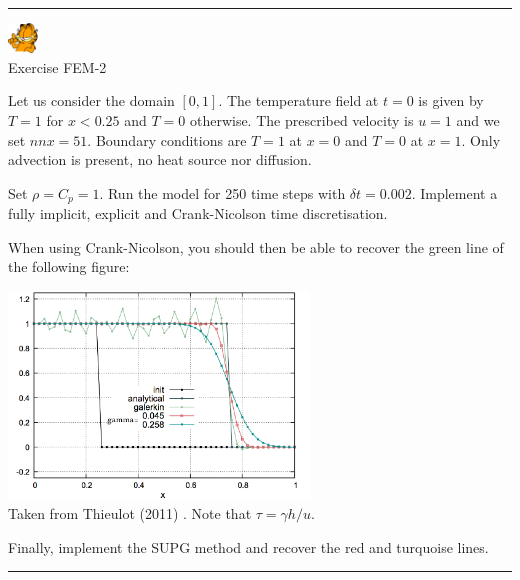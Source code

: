 \begin{center}
\begin{minipage}[t]{0.77\textwidth}
\par\noindent\rule{\textwidth}{0.4pt}

\begin{center}
\includegraphics[width=0.8cm]{images/garftr} \\
{\color{orange}Exercise FEM-2}
\end{center}

Let us consider the domain $[0,1]$. The temperature field at $t=0$ is 
given by $T=1$ for $x<0.25$ and $T=0$ otherwise. The prescribed 
velocity is $u=1$ and we set $nnx=51$.
Boundary conditions are $T=1$ at $x=0$ and $T=0$ at $x=1$.
Only advection is present, no heat source nor diffusion.

\begin{center}

\end{center}

Set $\rho=C_p=1$.
Run the model for 250 time steps with $\delta t=0.002$.
Implement a fully implicit, explicit and Crank-Nicolson 
time discretisation. 

When using Crank-Nicolson, you should then be able to recover the green line of the 
following figure:
\begin{center}
\includegraphics[width=8cm]{images/fem_exercises/fantom3.png} \\
{\captionfont Taken from Thieulot (2011) \cite{thie11}. Note that $\tau=\gamma h/u$.}
\end{center}

Finally, implement the SUPG method and recover the red and turquoise lines.

\par\noindent\rule{\textwidth}{0.4pt}
\end{minipage}
\end{center}











